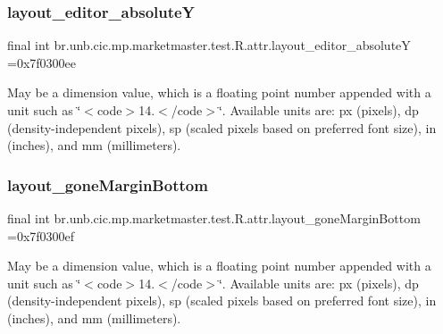 \subsubsection{\texorpdfstring{layout\+\_\+editor\+\_\+absoluteY}{layout\_editor\_absoluteY}}
{\footnotesize\ttfamily final int br.\+unb.\+cic.\+mp.\+marketmaster.\+test.\+R.\+attr.\+layout\+\_\+editor\+\_\+absoluteY =0x7f0300ee\hspace{0.3cm}{\ttfamily [static]}}

May be a dimension value, which is a floating point number appended with a unit such as \char`\"{}$<$code$>$14.\+5sp$<$/code$>$\char`\"{}. Available units are\+: px (pixels), dp (density-\/independent pixels), sp (scaled pixels based on preferred font size), in (inches), and mm (millimeters). \mbox{\label{classbr_1_1unb_1_1cic_1_1mp_1_1marketmaster_1_1test_1_1R_1_1attr_a12359a4ca4a0cd5f59cc87abb14e490a}} 
\subsubsection{\texorpdfstring{layout\+\_\+gone\+Margin\+Bottom}{layout\_goneMarginBottom}}
{\footnotesize\ttfamily final int br.\+unb.\+cic.\+mp.\+marketmaster.\+test.\+R.\+attr.\+layout\+\_\+gone\+Margin\+Bottom =0x7f0300ef\hspace{0.3cm}{\ttfamily [static]}}

May be a dimension value, which is a floating point number appended with a unit such as \char`\"{}$<$code$>$14.\+5sp$<$/code$>$\char`\"{}. Available units are\+: px (pixels), dp (density-\/independent pixels), sp (scaled pixels based on preferred font size), in (inches), and mm (millimeters). \mbox{\label{classbr_1_1unb_1_1cic_1_1mp_1_1marketmaster_1_1test_1_1R_1_1attr_a325794a21ef2abc62ab991891ce932f7}} 
